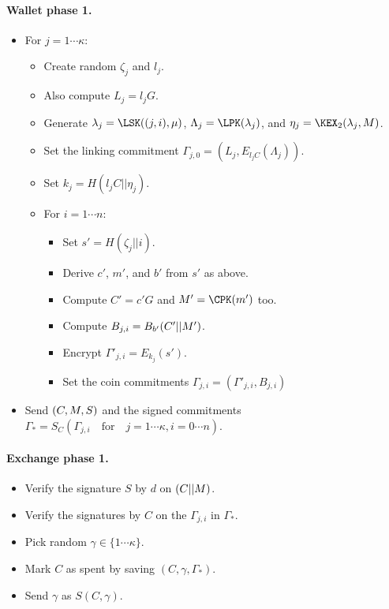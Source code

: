 \documentclass{llncs}
\begin{document}
\paragraph{Wallet phase 1.}
\begin{itemize}
\item  For $j=1 \cdots \kappa$:
   \begin{itemize}
   \item  Create random $\zeta_j$ and $l_j$.
   \item  Also compute $L_j = l_j G$.
   \item  Generate $\lambda_j = \LSK((j,i),\mu)$,
          $\Lambda_j = \LPK(\lambda_j)$, and
            $\eta_j = \KEX_2(\lambda_j,\Mu)$.
   \item  Set the linking commitment $\Gamma_{j,0} = (L_j,E_{l_j C}(\Lambda_j))$. 
   \item  Set $k_j = H(l_j C || \eta_j)$.
\smallskip
   \item  For $i=1 \cdots n$:
      \begin{itemize}
      \item  Set $s' = H(\zeta_j || i)$.
      \item  Derive $c'$, $m'$, and $b'$ from $s'$ as above.
      \item  Compute $C' = c' G$ and $\Mu' = \CPK(m')$ too.
      \item  Compute $B_{j,i} = B_{b'}(C' || M')$.
      \item  Encrypt $\Gamma'_{j,i} = E_{k_j}(s')$. 
      \item  Set the coin commitments $\Gamma_{j,i} = (\Gamma'_{j,i},B_{j,i})$
\end{itemize}
\smallskip
\end{itemize}
\item  Send $(C,M,S)$ and the signed commitments
   $\Gamma_* = S_C( \Gamma_{j,i} \quad\textrm{for}\quad j=1\cdots\kappa, i=0 \cdots n )$.
\end{itemize}

\paragraph{Exchange phase 1.}
\begin{itemize}
\item  Verify the signature $S$ by $d$ on $(C || M)$.
\item  Verify the signatures by $C$ on the $\Gamma_{j,i}$ in $\Gamma_*$.
\item  Pick random $\gamma \in \{1 \cdots \kappa\}$.
\item  Mark $C$ as spent by saving $(C,\gamma,\Gamma_*)$.
\item  Send $\gamma$ as $S(C,\gamma)$.
\end{itemize}
\end{document}
